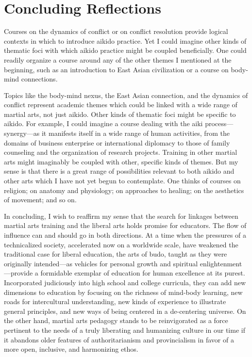 \section*{Concluding Reflections}

Courses on the dynamics of conflict or on conflict resolution provide logical contexts in which to introduce aikido practice. Yet I could imagine other kinds of thematic foci with which aikido practice might be coupled beneficially. One could readily organize a course around any of the other themes I mentioned at the beginning, such as an introduction to East Asian civilization or a course on body-mind connections. 

Topics like the body-mind nexus, the East Asian connection, and the dynamics of conflict represent academic themes which could be linked with a wide range of martial arts, not just aikido. Other kinds of thematic foci might be specific to aikido. For example, I could imagine a course dealing with the aiki process---synergy---as it manifests itself in a wide range of human activities, from the domains of business enterprise or international diplomacy to those of family counseling and the organization of research projects. Training in other martial arts might imaginably be coupled with other, specific kinds of themes. But my sense is that there is a great range of possibilities relevant to both aikido and other arts which I have not yet begun to contemplate. One thinks of courses on religion; on anatomy and physiology; on approaches to healing; on the aesthetics of movement; and so on.

In concluding, I wish to reaffirm my sense that the search for linkages between martial arts training and the liberal arts holds promise for educators. The flow of influence can and should go in both directions. At a time when the pressures of a technicalized society, accelerated now on a worldwide scale, have weakened the traditional case for liberal education, the arts of budo, taught as they were originally intended---as vehicles for personal growth and spiritual enlightenment---provide a formidable exemplar of education for human excellence at its purest. Incorporated judiciously into high school and college curricula, they can add new dimensions to education by focusing on the richness of mind-body learning, new roads for intercultural understanding, new kinds of experience to illustrate general principles, and new ways of being centered in a de-centering universe. On the other hand, martial arts pedagogy stands to be reinvigorated as a force pertinent to the needs of a truly liberating and humanizing culture in our time if it abandons older features of authoritarianism and provincialism in favor of a more open, inclusive, and harmonizing ethos.